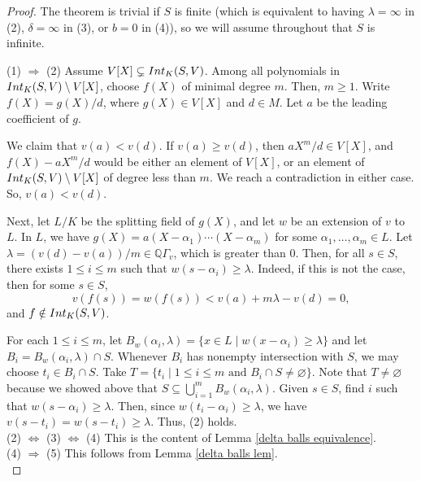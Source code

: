 \documentclass{article}
\theoremstyle{definition}\newtheorem{Def}[equation]{Definition}
\theoremstyle{definition}\newtheorem{Ques}[equation]{Question}
\theoremstyle{definition}\newtheorem{Conj}[equation]{Conjecture}
\theoremstyle{definition}\newtheorem{Not}[equation]{Notation}
\newcommand{\Q}{\mathbb{Q}}
\newcommand{\Int}{\textnormal{Int}}
\numberwithin{equation}{section}
\begin{document}
\begin{proof}
The theorem is trivial if $S$ is finite (which is equivalent to having $\lambda = \infty$ in (2), $\delta=\infty$ in (3), or $b=0$ in (4)), so we will assume throughout that $S$ is infinite.

(1) $\Rightarrow$ (2) Assume $V[X] \subsetneq \Int_K(S,V)$. Among all polynomials in $\Int_K(S,V) \setminus V[X]$, choose $f(X)$ of minimal degree $m$. Then, $m \geq 1$. Write $f(X) = g(X)/d$, where $g(X) \in V[X]$ and $d \in M$. Let $a$ be the leading coefficient of $g$.

We claim that $v(a) < v(d)$. If $v(a) \geq v(d)$, then $aX^m/d \in V[X]$, and $f(X) - aX^m/d$ would be either an element of $V[X]$, or an element of $\Int_K(S,V) \setminus V[X]$ of degree less than $m$. We reach a contradiction in either case. So, $v(a) < v(d)$.

Next, let $L/K$ be the splitting field of $g(X)$, and let $w$ be an extension of $v$ to $L$. In $L$, we have $g(X) = a(X-\alpha_1) \cdots (X-\alpha_m)$ for some $\alpha_1, \ldots, \alpha_m \in L$. Let $\lambda = (v(d)-v(a))/m \in \Q\Gamma_v$, which is greater than 0. Then, for all $s \in S$, there exists $1 \leq i \leq m$ such that $w(s-\alpha_i) \geq \lambda$. Indeed, if this is not the case, then for some $s \in S$,
\begin{equation*}
v(f(s)) = w(f(s)) < v(a) + m\lambda - v(d) = 0,
\end{equation*}
and $f \notin \Int_K(S,V)$.

For each $1 \leq i \leq m$, let $B_w(\alpha_i, \lambda) = \{x \in L \mid w(x-\alpha_i) \geq \lambda \}$ and let $B_i = B_w(\alpha_i, \lambda) \cap S$. Whenever $B_i$ has nonempty intersection with $S$, we may choose $t_i \in B_i \cap S$. 
Take $T = \{t_i \mid 1 \leq i \leq m \text{ and } B_i \cap S \ne \varnothing\}$. Note that $T\not=\varnothing$ because we showed above that $S\subseteq \bigcup_{i=1}^m B_w(\alpha_i,\lambda)$. Given $s \in S$, find $i$ such that $w(s-\alpha_i) \geq \lambda$. Then, since $w(t_i - \alpha_i) \geq \lambda$, we have $v(s-t_i) = w(s-t_i) \geq \lambda$. Thus, (2) holds. \\ 

(2) $\Leftrightarrow$ (3) $\Leftrightarrow$ (4) This is the content of Lemma \ref{delta balls equivalence}.\\

(4) $\Rightarrow$ (5) This follows from Lemma \ref{delta balls lem}.\\


\end{proof}
\end{document}
